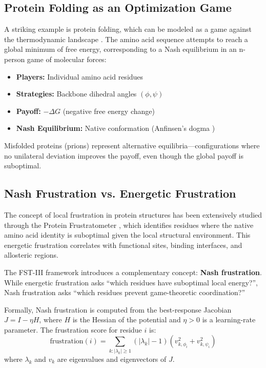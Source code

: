 \documentclass[12pt,a4paper]{article}
\theoremstyle{remark}
\begin{document}
\subsection{Protein Folding as an Optimization Game}

A striking example is protein folding, which can be modeled as a game against the thermodynamic landscape \citep{EnzymeFolding}. The amino acid sequence attempts to reach a global minimum of free energy, corresponding to a Nash equilibrium in an n-person game of molecular forces:

\begin{itemize}
    \item \textbf{Players:} Individual amino acid residues
    \item \textbf{Strategies:} Backbone dihedral angles $(\phi, \psi)$
    \item \textbf{Payoff:} $-\Delta G$ (negative free energy change)
    \item \textbf{Nash Equilibrium:} Native conformation (Anfinsen's dogma \citep{Anfinsen1973})
\end{itemize}

Misfolded proteins (prions) represent alternative equilibria---configurations where no unilateral deviation improves the payoff, even though the global payoff is suboptimal.

\subsection{Nash Frustration vs. Energetic Frustration}

The concept of local frustration in protein structures has been extensively studied through the Protein Frustratometer \citep{Ferreiro2007,Ferreiro2014}, which identifies residues where the native amino acid identity is suboptimal given the local structural environment. This energetic frustration correlates with functional sites, binding interfaces, and allosteric regions.

The FST-III framework introduces a complementary concept: \textbf{Nash frustration}. While energetic frustration asks ``which residues have suboptimal local energy?'', Nash frustration asks ``which residues prevent game-theoretic coordination?''

Formally, Nash frustration is computed from the best-response Jacobian $J = I - \eta H$, where $H$ is the Hessian of the potential and $\eta > 0$ is a learning-rate parameter. The frustration score for residue $i$ is:
\begin{equation}
\text{frustration}(i) = \sum_{k: |\lambda_k| \geq 1} (|\lambda_k| - 1) \left( v_{k,\phi_i}^2 + v_{k,\psi_i}^2 \right)
\end{equation}
where $\lambda_k$ and $v_k$ are eigenvalues and eigenvectors of $J$.
\end{document}
